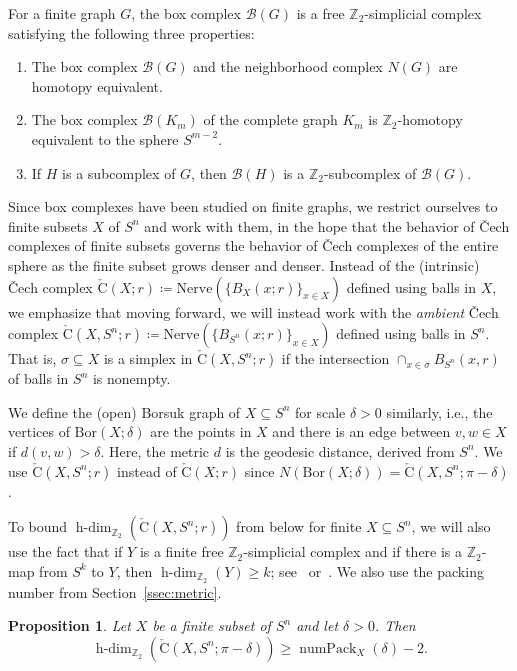 \documentclass[11 pt,a4paper,twoside,reqno]{amsart}
\newtheorem{proposition}[theorem]{Proposition}
\theoremstyle{definition}
\def\Z{{\mathbb Z}}
\def\cB{{\mathcal B}}
\newcommand{\cech}[2]{\mathrm{\check{C}}(#1;#2)}
\newcommand{\acech}[3]{\mathrm{\check{C}}(#1,#2;#3)}
\DeclareMathOperator{\numpack}{numPack}
\newcommand{\bor}[2]{\mathrm{Bor}(#1;#2)}
\DeclareMathOperator{\hdim}{h-dim}
\begin{document}
For a finite graph $G$, the box complex $\cB(G)$ is a free $\Z_2$-simplicial complex
satisfying the following three properties:
\begin{enumerate}
\item[(a)] The box complex $\cB(G)$ and the neighborhood complex $N(G)$ are homotopy equivalent.
\item[(b)] The box complex $\cB(K_m)$ of the complete graph $K_m$ is $\Z_2$-homotopy equivalent to the sphere $S^{m-2}$.
\item[(c)] If $H$ is a subcomplex of $G$, then $\cB(H)$ is a $\Z_2$-subcomplex of $\cB(G)$.
\end{enumerate}

Since box complexes have been studied on finite graphs, we restrict ourselves to finite subsets $X$ of $S^n$ and work with them, in the hope that the behavior of \v{C}ech complexes of finite subsets governs the behavior of \v{C}ech complexes of the entire sphere as the finite subset grows denser and denser.
Instead of the (intrinsic) \v{C}ech complex $\cech{X}{r}\coloneqq \mathrm{Nerve}(\{B_{X}(x;r)\}_{x\in X})$ defined using balls in $X$, we emphasize that moving forward, we will instead work with the \emph{ambient} \v{C}ech complex $\acech{X}{S^n}{r}\coloneqq \mathrm{Nerve}(\{B_{S^n}(x;r)\}_{x\in X})$ defined using balls in $S^n$.
That is, $\sigma \subseteq X$ is a simplex in $\acech{X}{S^n}{r}$ if the intersection $\cap_{x\in \sigma}B_{S^n}(x,r)$ of balls in $S^n$ is nonempty.

We define the (open) Borsuk graph of $X\subseteq S^n$ for scale $\delta>0$ similarly, i.e., the vertices of $\bor{X}{\delta}$ are the points in $X$ and there is an edge between $v, w\in X$ if $d(v, w)> \delta$.
Here, the metric $d$ is the geodesic distance, derived from $S^n$.
We use $\acech{X}{S^n}{r}$ instead of $\cech{X}{r}$ since $N(\bor{X}{\delta}) = \acech{X}{S^n}{\pi-\delta}$.

To bound $\hdim_{\Z_2}(\acech{X}{S^n}{r})$ from below for finite $X\subseteq S^n$, we will also use the fact that if $Y$ is a finite free $\Z_2$-simplicial complex and if there is a $\Z_2$-map from $S^k$ to $Y$, then $\hdim_{\Z_2}(Y)\ge k$; see~\cite[Lemma~7]{matsushita2023dominance} or~\cite[Lemma~4.4]{MatsushitaWakatsuki}.
We also use the packing number from Section~\ref{ssec:metric}.

\begin{proposition}\label{z2hdim}
Let $X$ be a finite subset of $S^n$ and let $\delta > 0$.
Then
\[
\hdim_{\Z_2}(\acech{X}{S^n}{\pi-\delta}) \geq \numpack_{X}(\delta)-2.
\]
\end{proposition}
\end{document}

